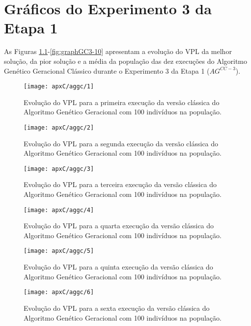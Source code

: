 \chapter{Gráficos do Experimento 3 da Etapa 1}

As Figuras \ref{fig:graphGC3-01}-\ref{fig:graphGC3-10} apresentam a evolução do VPL da melhor solução, da pior solução e a média da população das dez execuções do Algoritmo Genético Geracional Clássico durante o Experimento 3 da Etapa 1 ($AG^{CC-3}$).

\begin{figure}[H]
\centering
\texttt{[image: apxC/aggc/1]}
\caption{Evolução do VPL para a primeira execução da versão clássica do Algoritmo Genético Geracional com 100 indivíduos na população.}
\label{fig:graphGC3-01}
\end{figure}

\begin{figure}[H]
\centering
\texttt{[image: apxC/aggc/2]}
\caption{Evolução do VPL para a segunda execução da versão clássica do Algoritmo Genético Geracional com 100 indivíduos na população.}
\label{fig:graphGC3-02}
\end{figure}

\begin{figure}[H]
\centering
\texttt{[image: apxC/aggc/3]}
\caption{Evolução do VPL para a terceira execução da versão clássica do Algoritmo Genético Geracional com 100 indivíduos na população.}
\label{fig:graphGC3-03}
\end{figure}

\begin{figure}[H]
\centering
\texttt{[image: apxC/aggc/4]}
\caption{Evolução do VPL para a quarta execução da versão clássica do Algoritmo Genético Geracional com 100 indivíduos na população.}
\label{fig:graphGC3-04}
\end{figure}

\begin{figure}[H]
\centering
\texttt{[image: apxC/aggc/5]}
\caption{Evolução do VPL para a quinta execução da versão clássica do Algoritmo Genético Geracional com 100 indivíduos na população.}
\label{fig:graphGC3-05}
\end{figure}

\begin{figure}[H]
\centering
\texttt{[image: apxC/aggc/6]}
\caption{Evolução do VPL para a sexta execução da versão clássica do Algoritmo Genético Geracional com 100 indivíduos na população.}
\label{fig:graphGC3-06}
\end{figure}

